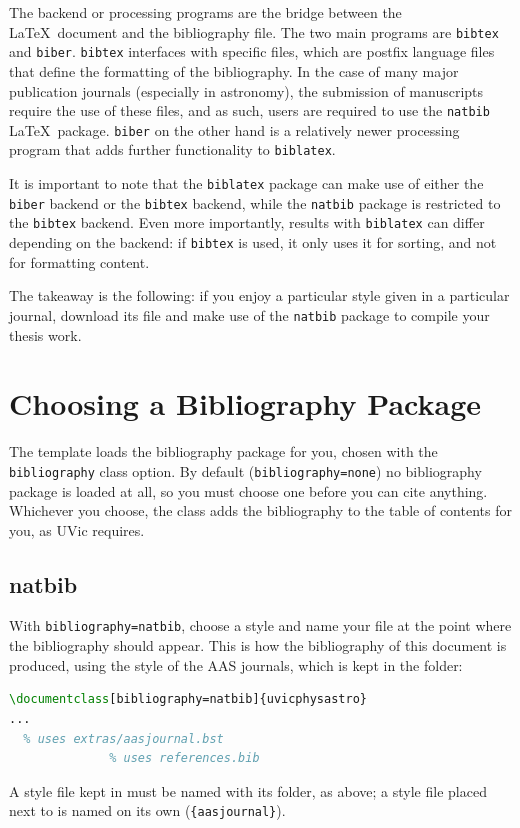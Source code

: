The backend or processing programs are the bridge between the \LaTeX\ document and the bibliography file. The two main programs are \texttt{bibtex} and \texttt{biber}. \texttt{bibtex} interfaces with specific  files, which are postfix language files that define the formatting of the bibliography. In the case of many major publication journals (especially in astronomy), the submission of manuscripts require the use of these  files, and as such, users are required to use the \texttt{natbib} \LaTeX\ package. \texttt{biber} on the other hand is a relatively newer processing program that adds further functionality to \texttt{biblatex}.

It is important to note that the \texttt{biblatex} package can make use of either the \texttt{biber} backend or the \texttt{bibtex} backend, while the \texttt{natbib} package is restricted to the \texttt{bibtex} backend. Even more importantly, results with \texttt{biblatex} can differ depending on the backend: if \texttt{bibtex} is used, it only uses it for sorting, and not for formatting content.

The takeaway is the following: if you enjoy a particular style given in a particular journal, download its  file and make use of the \texttt{natbib} package to compile your thesis work.

\section{Choosing a Bibliography Package}
\label{sec:bib-choosing}

The template loads the bibliography package for you, chosen with the \texttt{bibliography} class option. By default (\texttt{bibliography=none}) no bibliography package is loaded at all, so you must choose one before you can cite anything. Whichever you choose, the class adds the bibliography to the table of contents for you, as UVic requires.

\subsection{natbib}

With \texttt{bibliography=natbib}, choose a  style and name your  file at the point where the bibliography should appear. This is how the bibliography of this document is produced, using the  style of the AAS journals, which is kept in the  folder:
\begin{lstlisting}[language=TeX]
\documentclass[bibliography=natbib]{uvicphysastro}
...
  % uses extras/aasjournal.bst
              % uses references.bib
\end{lstlisting}
A style file kept in  must be named with its folder, as above; a style file placed next to  is named on its own (\texttt{\{aasjournal\}}).

